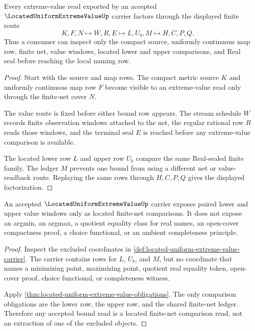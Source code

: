 \begin{theorem}
\label{thm:located-uniform-extreme-value-finite-net-exposure}
Every extreme-value read exported by an accepted $\LocatedUniformExtremeValueUp$ carrier factors through the displayed finite route
$$
K,F,N \longmapsto W,R,E \longmapsto L,U_b,M \longmapsto H,C,P,Q .
$$
Thus a consumer can inspect only the compact source, uniformly continuous map row, finite net, value windows, located lower and upper comparisons, and Real seal before reaching the local naming row.
\end{theorem}
\begin{proof}
Start with the source and map rows. The compact metric source $K$ and uniformly continuous map row $F$ become visible to an extreme-value read only through the finite-net cover $N$.

The value route is fixed before either bound row appears. The stream schedule $W$ records finite observation windows attached to the net, the regular rational row $R$ reads those windows, and the terminal seal $E$ is reached before any extreme-value comparison is available.

The located lower row $L$ and upper row $U_b$ compare the same Real-sealed finite family. The ledger $M$ prevents one bound from using a different net or value-readback route. Replaying the same rows through $H,C,P,Q$ gives the displayed factorization.
\end{proof}

\begin{theorem}
\label{thm:located-uniform-extreme-value-bounds}
An accepted $\LocatedUniformExtremeValueUp$ carrier exposes paired lower and upper value windows only as located finite-net comparisons. It does not expose an argmin, an argmax, a quotient equality class for real names, an open-cover compactness proof, a choice functional, or an ambient completeness principle.
\end{theorem}
\begin{proof}
Inspect the excluded coordinates in \autoref{def:located-uniform-extreme-value-carrier}. The carrier contains rows for $L$, $U_b$, and $M$, but no coordinate that names a minimizing point, maximizing point, quotient real equality token, open-cover proof, choice functional, or completeness witness.

Apply \autoref{thm:located-uniform-extreme-value-obligations}. The only comparison obligations are the lower row, the upper row, and the shared finite-net ledger. Therefore any accepted bound read is a located finite-net comparison read, not an extraction of one of the excluded objects.
\end{proof}

